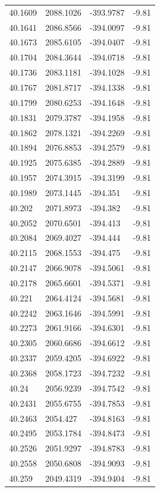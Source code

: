 \begin{table}[H]
\begin{tabular}{llll}
40.1609 & 2088.1026 & -393.9787 & -9.81 \\
40.1641 & 2086.8566 & -394.0097 & -9.81 \\
40.1673 & 2085.6105 & -394.0407 & -9.81 \\
40.1704 & 2084.3644 & -394.0718 & -9.81 \\
40.1736 & 2083.1181 & -394.1028 & -9.81 \\
40.1767 & 2081.8717 & -394.1338 & -9.81 \\
40.1799 & 2080.6253 & -394.1648 & -9.81 \\
40.1831 & 2079.3787 & -394.1958 & -9.81 \\
40.1862 & 2078.1321 & -394.2269 & -9.81 \\
40.1894 & 2076.8853 & -394.2579 & -9.81 \\
40.1925 & 2075.6385 & -394.2889 & -9.81 \\
40.1957 & 2074.3915 & -394.3199 & -9.81 \\
40.1989 & 2073.1445 & -394.351 & -9.81 \\
40.202 & 2071.8973 & -394.382 & -9.81 \\
40.2052 & 2070.6501 & -394.413 & -9.81 \\
40.2084 & 2069.4027 & -394.444 & -9.81 \\
40.2115 & 2068.1553 & -394.475 & -9.81 \\
40.2147 & 2066.9078 & -394.5061 & -9.81 \\
40.2178 & 2065.6601 & -394.5371 & -9.81 \\
40.221 & 2064.4124 & -394.5681 & -9.81 \\
40.2242 & 2063.1646 & -394.5991 & -9.81 \\
40.2273 & 2061.9166 & -394.6301 & -9.81 \\
40.2305 & 2060.6686 & -394.6612 & -9.81 \\
40.2337 & 2059.4205 & -394.6922 & -9.81 \\
40.2368 & 2058.1723 & -394.7232 & -9.81 \\
40.24 & 2056.9239 & -394.7542 & -9.81 \\
40.2431 & 2055.6755 & -394.7853 & -9.81 \\
40.2463 & 2054.427 & -394.8163 & -9.81 \\
40.2495 & 2053.1784 & -394.8473 & -9.81 \\
40.2526 & 2051.9297 & -394.8783 & -9.81 \\
40.2558 & 2050.6808 & -394.9093 & -9.81 \\
40.259 & 2049.4319 & -394.9404 & -9.81 \\

\end{tabular}
\end{table}

